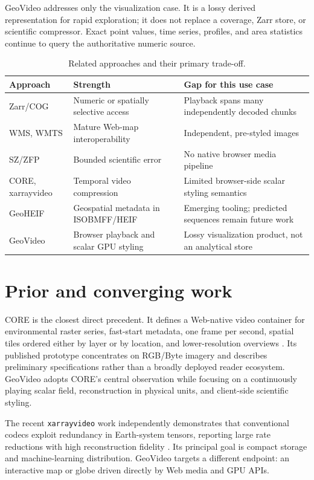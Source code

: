 \documentclass[11pt]{article}
\begin{document}
GeoVideo addresses only the visualization case. It is a lossy derived representation for rapid exploration; it does not replace a coverage, Zarr store, or scientific compressor. Exact point values, time series, profiles, and area statistics continue to query the authoritative numeric source.

\begin{table}[t]
\centering
\small
\caption{Related approaches and their primary trade-off.}
\begin{tabular}{@{}p{}p{}p{}@{}}
\toprule
Approach & Strength & Gap for this use case \\
\midrule
Zarr/COG & Numeric or spatially selective access & Playback spans many independently decoded chunks \\
WMS, WMTS & Mature Web-map interoperability & Independent, pre-styled images \\
SZ/ZFP & Bounded scientific error & No native browser media pipeline \\
CORE, xarrayvideo & Temporal video compression & Limited browser-side scalar styling semantics \\
GeoHEIF & Geospatial metadata in ISOBMFF/HEIF & Emerging tooling; predicted sequences remain future work \\
GeoVideo & Browser playback and scalar GPU styling & Lossy visualization product, not an analytical store \\
\bottomrule
\end{tabular}
\end{table}

\section{Prior and converging work}
CORE is the closest direct precedent. It defines a Web-native video container for environmental raster series, fast-start metadata, one frame per second, spatial tiles ordered either by layer or by location, and lower-resolution overviews \cite{core}. Its published prototype concentrates on RGB/Byte imagery and describes preliminary specifications rather than a broadly deployed reader ecosystem. GeoVideo adopts CORE's central observation while focusing on a continuously playing scalar field, reconstruction in physical units, and client-side scientific styling.

The recent \texttt{xarrayvideo} work independently demonstrates that conventional codecs exploit redundancy in Earth-system tensors, reporting large rate reductions with high reconstruction fidelity \cite{xarrayvideo}. Its principal goal is compact storage and machine-learning distribution. GeoVideo targets a different endpoint: an interactive map or globe driven directly by Web media and GPU APIs.
\end{document}
